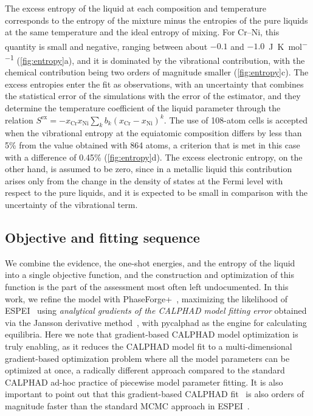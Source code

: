The excess entropy of the liquid at each composition and temperature corresponds to the entropy of the mixture minus the entropies of the pure liquids at the same temperature and the ideal entropy of mixing. For Cr--Ni, this quantity is small and negative, ranging between about $-0.1$ and $-1.0$~\unit{\J\per\K\per\mole} (\cref{fig:entropy}a), and it is dominated by the vibrational contribution, with the chemical contribution being two orders of magnitude smaller (\cref{fig:entropy}c). The excess entropies enter the fit as observations, with an uncertainty that combines the statistical error of the simulations with the error of the estimator, and they determine the temperature coefficient of the liquid parameter through the relation $S^{\mathrm{ex}} = -x_{\mathrm{Cr}} x_{\mathrm{Ni}} \sum_k b_k (x_{\mathrm{Cr}} - x_{\mathrm{Ni}})^k$. The use of 108-atom cells is accepted when the vibrational entropy at the equiatomic composition differs by less than 5\% from the value obtained with 864 atoms, a criterion that is met in this case with a difference of 0.45\% (\cref{fig:entropy}d). The excess electronic entropy, on the other hand, is assumed to be zero, since in a metallic liquid this contribution arises only from the change in the density of states at the Fermi level with respect to the pure liquids, and it is expected to be small in comparison with the uncertainty of the vibrational term.

\subsection{Objective and fitting sequence}
\label{sec:methods:objective}
\label{sec:methods:sequence}

We combine the evidence, the one-shot energies, and the entropy of the liquid into a single objective function, and the construction and optimization of this function is the part of the assessment most often left undocumented. In this work, we refine the model with PhaseForge+~\cite{sariturk2025phaseforgeplus}, maximizing the likelihood of ESPEI~\cite{bocklund2019espei} using \emph{analytical gradients of the CALPHAD model fitting error} obtained via the Jansson derivative method~\cite{kunselman2024analytically,kunselman2025analytical}, with pycalphad as the engine for calculating equilibria. Here we note that gradient-based CALPHAD  model optimization is truly enabling, as it reduces the CALPHAD model fit to a multi-dimensional gradient-based optimization problem where all the model parameters can be optimized at once, a radically different approach compared to the standard CALPHAD ad-hoc practice of piecewise model parameter fitting. It is also important to point out that this gradient-based CALPHAD fit~\cite{kunselman2025analytical,kunselman2026hmc} is also orders of magnitude faster than the standard MCMC approach in ESPEI~\cite{bocklund2019espei}.

